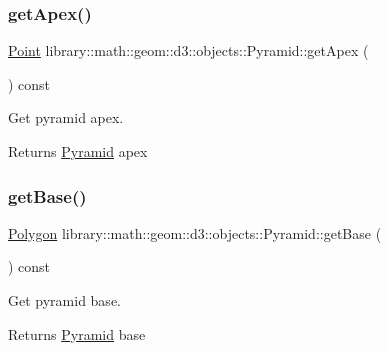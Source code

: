 \subsubsection{\texorpdfstring{get\+Apex()}{getApex()}}
{\footnotesize\ttfamily \hyperlink{classlibrary_1_1math_1_1geom_1_1d3_1_1objects_1_1_point}{Point} library\+::math\+::geom\+::d3\+::objects\+::\+Pyramid\+::get\+Apex (\begin{DoxyParamCaption}{ }\end{DoxyParamCaption}) const}



Get pyramid apex. 

\begin{DoxyReturn}{Returns}
\hyperlink{classlibrary_1_1math_1_1geom_1_1d3_1_1objects_1_1_pyramid}{Pyramid} apex 
\end{DoxyReturn}
\mbox{\label{classlibrary_1_1math_1_1geom_1_1d3_1_1objects_1_1_pyramid_a247e3c188d7919b2043e59d46b67c2ef}} 
\subsubsection{\texorpdfstring{get\+Base()}{getBase()}}
{\footnotesize\ttfamily \hyperlink{classlibrary_1_1math_1_1geom_1_1d3_1_1objects_1_1_polygon}{Polygon} library\+::math\+::geom\+::d3\+::objects\+::\+Pyramid\+::get\+Base (\begin{DoxyParamCaption}{ }\end{DoxyParamCaption}) const}



Get pyramid base. 

\begin{DoxyReturn}{Returns}
\hyperlink{classlibrary_1_1math_1_1geom_1_1d3_1_1objects_1_1_pyramid}{Pyramid} base 
\end{DoxyReturn}
\mbox{\label{classlibrary_1_1math_1_1geom_1_1d3_1_1objects_1_1_pyramid_a36f5527c9708f2d44fdddaf7c9ac5ea0}} 
